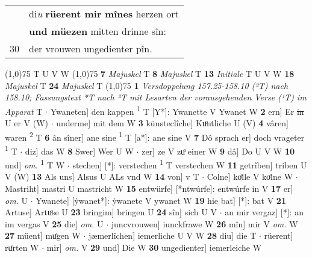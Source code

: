 \documentclass[8pt,a4paper,notitlepage]{article}
\begin{document}
\begin{table}[ht]
\begin{minipage}[t]{0.5\linewidth}
\begin{tabular}{rl}
 & di\textit{u} \textbf{rüerent mir} \textbf{mînes} herzen ort\\ 
 & \textbf{und müezen} mitten drinne sîn:\\ 
30 & der vrouwen ungedienter pîn.\\ 
\end{tabular}
\scriptsize
\line(1,0){75} \newline
T U V W \newline
\line(1,0){75} \newline
\textbf{7} \textit{Majuskel} T  \textbf{8} \textit{Majuskel} T  \textbf{13} \textit{Initiale} T U V W  \textbf{18} \textit{Majuskel} T  \textbf{24} \textit{Majuskel} T  \newline
\line(1,0){75} \newline
\textbf{1} \textit{Versdoppelung 157.25-158.10 (²T) nach 158.10; Fassungstext *T nach ²T mit Lesarten der vorausgehenden Verse (¹T) im Apparat} T   $\cdot$ Ywaneten] den kappen \textsuperscript{1}\hspace{-1.3mm} T [Y*]: Ywanette V Ywanet W \textbf{2} ern] Er \sout{in} U er V (W)  $\cdot$ underme] mit dem W \textbf{3} künsteclîche] Kuͦntliche U (V) \textbf{4} vâren] waren \textsuperscript{2}\hspace{-1.3mm} T \textbf{6} ân sîner] ane sine \textsuperscript{1}\hspace{-1.3mm} T [a*]: ane sine V \textbf{7} Dô sprach er] doch vrageter \textsuperscript{1}\hspace{-1.3mm} T  $\cdot$ diz] das W \textbf{8} Swer] Wer U W  $\cdot$ zer] ze V zuͦ einer W \textbf{9} dâ] Do U V W \textbf{10} und] \textit{om.} \textsuperscript{1}\hspace{-1.3mm} T W  $\cdot$ stechen] [*]: verstechen \textsuperscript{1}\hspace{-1.3mm} T verstechen W \textbf{11} getrîben] triben U V (W) \textbf{13} Als uns] Alsus U ALs vnd W \textbf{14} von] v T  $\cdot$ Colne] koͤlle V koͤlne W  $\cdot$ Mastriht] mastri U mastricht W \textbf{15} entwürfe] [*ntwúrfe]: entwúrfe in V \textbf{17} er] \textit{om.} U  $\cdot$ Ywanete] [ẏwanet*]: ẏwanete V ywanet W \textbf{19} hie bat] [*]: bat V \textbf{21} Artuse] Artuͦse U \textbf{23} bringim] bringen U \textbf{24} sîn] sich U V  $\cdot$ an mir vergaz] [*]: an im vergas V \textbf{25} die] \textit{om.} U  $\cdot$ juncvrouwen] iunckfrawe W \textbf{26} mîn] mir V \textit{om.} W \textbf{27} müent] muͤgen W  $\cdot$ jæmerlîchen] iemerliche U V W \textbf{28} diu] die T  $\cdot$ rüerent] ruͦrten W  $\cdot$ mir] \textit{om.} V \textbf{29} und] Die W \textbf{30} ungedienter] iemerleiche W \newline
\end{minipage}
\end{table}
\end{document}
